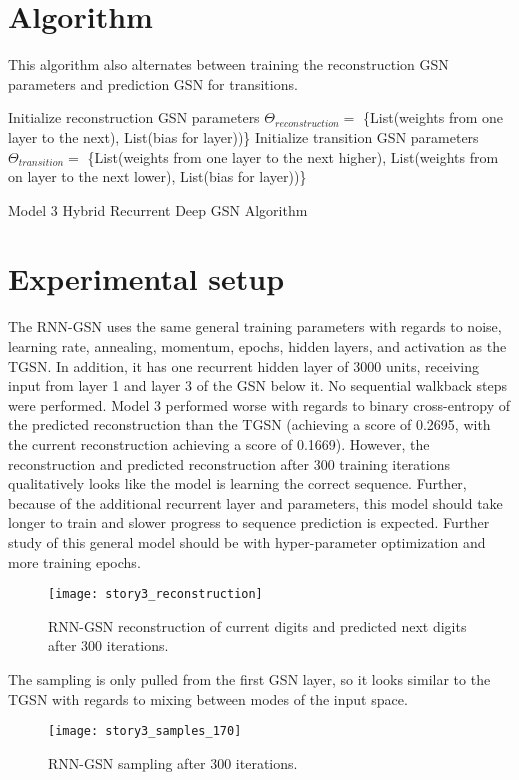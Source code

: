 \section{Algorithm}
This algorithm also alternates between training the reconstruction GSN parameters and prediction GSN for transitions.
 \begin{algorithm}[h!]
	Initialize reconstruction GSN parameters \(\Theta_{reconstruction} = \) \{List(weights from one layer to the next), List(bias for layer))\}\;
	Initialize transition GSN parameters \(\Theta_{transition} = \) \{List(weights from one layer to the next higher), List(weights from on layer to the next lower), List(bias for layer))\}\;
	\caption{ Model 3 Hybrid  Recurrent Deep GSN Algorithm }
\end{algorithm}


\section{Experimental setup}
The RNN-GSN uses the same general training parameters with regards to noise, learning rate, annealing, momentum, epochs, hidden layers, and activation as the TGSN. In addition, it has one recurrent hidden layer of 3000 units, receiving input from layer 1 and layer 3 of the GSN below it. No sequential walkback steps were performed. Model 3 performed worse with regards to binary cross-entropy of the predicted reconstruction than the TGSN (achieving a score of 0.2695, with the current reconstruction achieving a score of 0.1669). However, the reconstruction and predicted reconstruction after 300 training iterations qualitatively looks like the model is learning the correct sequence. Further, because of the additional recurrent layer and parameters, this model should take longer to train and slower progress to sequence prediction is expected. Further study of this general model should be with hyper-parameter optimization and more training epochs.

\begin{figure}[h!]
  \centering
    \texttt{[image: story3\_reconstruction]}
\caption{RNN-GSN reconstruction of current digits and predicted next digits after 300 iterations.}
\end{figure}

The sampling is only pulled from the first GSN layer, so it looks similar to the TGSN with regards to mixing between modes of the input space.
\begin{figure}[h!]
  \centering
    \texttt{[image: story3\_samples\_170]}
\caption{RNN-GSN sampling after 300 iterations.}
\end{figure}
